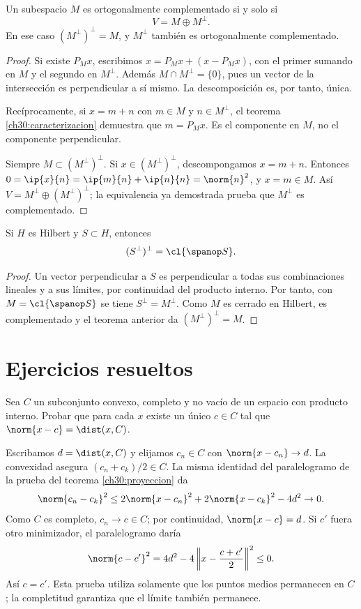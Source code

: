 \begin{teorema}\label{ch30:descomposicion}
Un subespacio $M$ es ortogonalmente complementado si y solo si
\[
 V=M\oplus M^{\perp}.
\]
En ese caso $(M^{\perp})^{\perp}=M$, y $M^{\perp}$ también es ortogonalmente complementado.
\end{teorema}
\begin{proof}
Si existe $P_Mx$, escribimos $x=P_Mx+(x-P_Mx)$, con el primer sumando en $M$ y el segundo en $M^{\perp}$. Además $M\cap M^{\perp}=\{0\}$, pues un vector de la intersección es perpendicular a sí mismo. La descomposición es, por tanto, única.

Recíprocamente, si $x=m+n$ con $m\in M$ y $n\in M^{\perp}$, el teorema \ref{ch30:caracterizacion} demuestra que $m=P_Mx$. Es el componente en $M$, no el componente perpendicular.

Siempre $M\subset(M^{\perp})^{\perp}$. Si $x\in(M^{\perp})^{\perp}$, descompongamos $x=m+n$. Entonces $0=\ip{x}{n}=\ip{m}{n}+\ip{n}{n}=\norm{n}^{2}$, y $x=m\in M$. Así $V=M^{\perp}\oplus(M^{\perp})^{\perp}$; la equivalencia ya demostrada prueba que $M^{\perp}$ es complementado.
\end{proof}

\begin{corolario}\label{ch30:doble}
Si $H$ es Hilbert y $S\subset H$, entonces
\[
 (S^{\perp})^{\perp}=\cl{\spanop S}.
\]
\end{corolario}
\begin{proof}
Un vector perpendicular a $S$ es perpendicular a todas sus combinaciones lineales y a sus límites, por continuidad del producto interno. Por tanto, con $M=\cl{\spanop S}$ se tiene $S^{\perp}=M^{\perp}$. Como $M$ es cerrado en Hilbert, es complementado y el teorema anterior da $(M^{\perp})^{\perp}=M$.
\end{proof}

\section{Ejercicios resueltos}

\begin{ejercicio}
Sea $C$ un subconjunto convexo, completo y no vacío de un espacio con producto interno. Probar que para cada $x$ existe un único $c\in C$ tal que $\norm{x-c}=\dist(x,C)$.
\end{ejercicio}
\begin{solucion}
Escribamos $d=\dist(x,C)$ y elijamos $c_n\in C$ con $\norm{x-c_n}\to d$. La convexidad asegura $(c_n+c_k)/2\in C$. La misma identidad del paralelogramo de la prueba del teorema \ref{ch30:proyeccion} da
\[
 \norm{c_n-c_k}^{2}\leq2\norm{x-c_n}^{2}+2\norm{x-c_k}^{2}-4d^{2}\to0.
\]
Como $C$ es completo, $c_n\to c\in C$; por continuidad, $\norm{x-c}=d$. Si $c'$ fuera otro minimizador, el paralelogramo daría
\[
 \norm{c-c'}^{2}=4d^{2}-4\left\|x-\frac{c+c'}2\right\|^{2}\leq0.
\]
Así $c=c'$. Esta prueba utiliza solamente que los puntos medios permanecen en $C$; la completitud garantiza que el límite también permanece.
\end{solucion}

